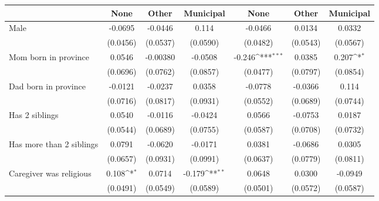 {
\def\sym#1{\ifmmode^{#1}\else\(^{#1}\)\fi}
\begin{tabular}{l*{6}{c}}
\toprule
                    &\multicolumn{1}{c}{None}&\multicolumn{1}{c}{Other}&\multicolumn{1}{c}{Municipal}&\multicolumn{1}{c}{None}&\multicolumn{1}{c}{Other}&\multicolumn{1}{c}{Municipal}\\
\midrule
Male                &     -0.0695         &     -0.0446         &       0.114         &     -0.0466         &      0.0134         &      0.0332         \\
                    &    (0.0456)         &    (0.0537)         &    (0.0590)         &    (0.0482)         &    (0.0543)         &    (0.0567)         \\
\addlinespace
Mom born in province&      0.0546         &    -0.00380         &     -0.0508         &      -0.246\sym{***}&      0.0385         &       0.207\sym{*}  \\
                    &    (0.0696)         &    (0.0762)         &    (0.0857)         &    (0.0477)         &    (0.0797)         &    (0.0854)         \\
\addlinespace
Dad born in province&     -0.0121         &     -0.0237         &      0.0358         &     -0.0778         &     -0.0366         &       0.114         \\
                    &    (0.0716)         &    (0.0817)         &    (0.0931)         &    (0.0552)         &    (0.0689)         &    (0.0744)         \\
\addlinespace
Has 2 siblings      &      0.0540         &     -0.0116         &     -0.0424         &      0.0566         &     -0.0753         &      0.0187         \\
                    &    (0.0544)         &    (0.0689)         &    (0.0755)         &    (0.0587)         &    (0.0708)         &    (0.0732)         \\
\addlinespace
Has more than 2 siblings&      0.0791         &     -0.0620         &     -0.0171         &      0.0381         &     -0.0686         &      0.0305         \\
                    &    (0.0657)         &    (0.0931)         &    (0.0991)         &    (0.0637)         &    (0.0779)         &    (0.0811)         \\
\addlinespace
Caregiver was religious&       0.108\sym{*}  &      0.0714         &      -0.179\sym{**} &      0.0648         &      0.0300         &     -0.0949         \\
                    &    (0.0491)         &    (0.0549)         &    (0.0589)         &    (0.0501)         &    (0.0572)         &    (0.0587)         \\

\end{tabular}}
